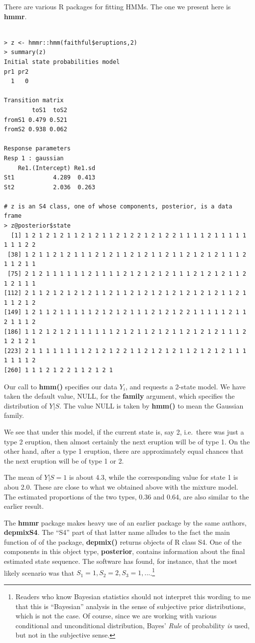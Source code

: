 \documentclass[11pt]{article}
\begin{document}
There are various R packages for fitting HMMs.  The one we present here
is \textbf{hmmr}.

\begin{lstlisting}

> z <- hmmr::hmm(faithful$eruptions,2)
> summary(z)
Initial state probabilities model 
pr1 pr2 
  1   0 

Transition matrix 
        toS1  toS2
fromS1 0.479 0.521
fromS2 0.938 0.062

Response parameters 
Resp 1 : gaussian 
    Re1.(Intercept) Re1.sd
St1           4.289  0.413
St2           2.036  0.263

# z is an S4 class, one of whose components, posterior, is a data frame
> z@posterior$state
  [1] 1 2 1 2 1 2 1 1 2 1 2 1 1 2 1 2 2 1 2 1 2 2 1 1 1 1 2 1 1 1 1 1 1 1 1 2 2
 [38] 1 2 1 1 2 1 2 1 1 1 2 1 2 1 1 2 1 2 1 1 2 1 1 2 1 2 1 2 1 1 1 2 1 1 2 1 1
 [75] 2 1 2 1 1 1 1 1 1 2 1 1 1 1 2 1 2 1 2 1 2 1 1 1 2 1 2 1 2 1 1 2 1 2 1 1 1
[112] 2 1 1 2 1 2 1 2 1 2 1 1 2 1 1 2 1 2 1 2 1 2 1 2 1 2 1 2 1 1 2 1 1 1 2 1 2
[149] 1 2 1 1 2 1 1 1 1 1 2 1 2 1 2 1 1 1 2 1 2 1 2 2 1 1 1 1 1 2 1 1 2 1 1 1 2
[186] 1 1 2 1 2 1 2 1 1 1 1 1 1 2 1 2 1 1 2 1 2 1 1 2 1 2 1 2 1 1 1 2 1 2 1 2 1
[223] 2 1 1 1 1 1 1 1 1 2 1 2 1 2 2 1 1 2 1 2 1 2 1 1 2 1 2 1 2 1 1 1 1 1 1 1 2
[260] 1 1 1 2 1 2 2 1 1 2 1 2 1

\end{lstlisting}

Our call to \textbf{hmm()} specifies our data $Y_i$, and requests a 2-state
model.  We have taken the default value, NULL, for the \textbf{family}
argument, which specifies the distribution of $Y | S$.  The value NULL
is taken by \textbf{hmm()} to mean the Gaussian family.

We see that under this model, if the current state is, say 2, i.e.\
there was just a type 2 eruption, then almost certainly the next
eruption will be of type 1.  On the other hand, after a type 1 eruption,
there are approximately equal chances that the next eruption will be of
type 1 or 2.

The mean of $Y | S = 1$ is about 4.3, while the corresponding value for
state 1 is abou 2.0.  These are close to what we obtained above with the
mixture model.  The estimated proportions of the two types, 0.36 and
0.64, are also similar to the earlier result.

The \textbf{hmmr} package makes heavy use of an earlier package by the
same authors, \textbf{depmixS4}.  The ``S4'' part of that latter name
alludes to the fact the main function of of the package, \textbf{depmix()}
returns objects of R class S4.  One of the components in this object
type, \textbf{posterior}, contains information about the final estimated
state sequence.  The software has found, for instance, that the most
likely scenario was that $S_1 = 1, S_2 = 2, S_3 = 1,
...$.\footnote{Readers who know Bayesian statistics should not interpret
this wording to me that this is ``Bayesian'' analysis in the sense of
subjective prior distributions, which is not the case.  Of course, since
we are working with various conditional and unconditional distribution,
Bayes' \textit{Rule} of probability \textit{is} used, but not in the
subjective sense.}
\end{document}
